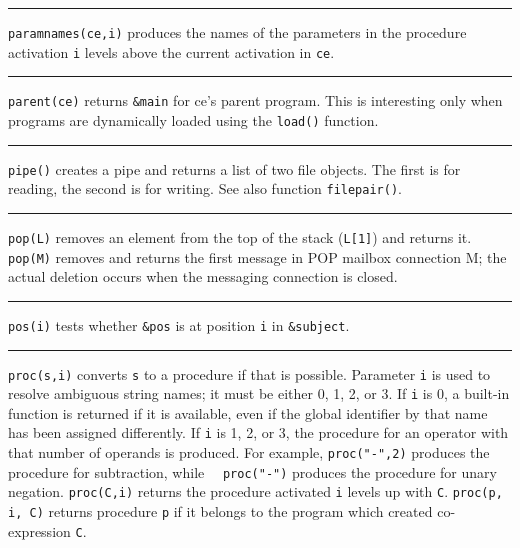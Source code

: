 \bigskip\hrule\vspace{0.1cm}

\noindent
{}\texttt{paramnames(ce,i)} produces the names of
the parameters in the procedure activation \texttt{i} levels above the
current activation in \texttt{ce}.

\bigskip\hrule\vspace{0.1cm}

\noindent
\texttt{parent(ce)} returns \texttt{\&main} for ce's
parent program. This is interesting only when programs are dynamically
loaded using the \texttt{load()} function.

\bigskip\hrule\vspace{0.1cm}

\noindent
{}\texttt{pipe()} creates a pipe and returns a list of two
file objects. The first is for reading, the second is for writing. See
also function \texttt{filepair()}.

\bigskip\hrule\vspace{0.1cm}

\noindent
{}\texttt{pop(L)} removes an element from the top of the
stack (\texttt{L[1]}) and returns it. \texttt{pop(M)}
removes and returns the first message in POP mailbox connection M; the
actual deletion occurs when the messaging connection is closed.

\bigskip\hrule\vspace{0.1cm}

\noindent
{}\texttt{pos(i)} tests whether \texttt{\&pos} is at
position \texttt{i} in \texttt{\&subject}.

\bigskip\hrule\vspace{0.1cm}

\noindent
{}\texttt{proc(s,i)} converts \texttt{s} to a procedure
if that is possible. Parameter \texttt{i} is used to resolve ambiguous
string names; it must be either 0, 1, 2, or 3. If \texttt{i} is 0, a
built-in function is returned if it is available, even if the global
identifier by that name has been assigned differently. If \texttt{i} is
1, 2, or 3, the procedure for an operator with that number of operands
is produced. For example,
\texttt{proc("-",2)} produces the procedure
for subtraction, while
\ \ \texttt{proc("-")} produces the
procedure for unary negation. \texttt{proc(C,i)} returns the procedure
activated \texttt{i} levels up with \texttt{C}. \texttt{proc(p, i, C)}
returns procedure \texttt{p} if it belongs to the program which created
co-expression \texttt{C}.

